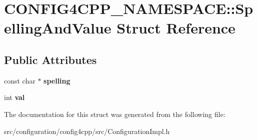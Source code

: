 \hypertarget{structCONFIG4CPP__NAMESPACE_1_1SpellingAndValue}{\section{C\-O\-N\-F\-I\-G4\-C\-P\-P\-\_\-\-N\-A\-M\-E\-S\-P\-A\-C\-E\-:\-:Spelling\-And\-Value Struct Reference}
\label{structCONFIG4CPP__NAMESPACE_1_1SpellingAndValue}
}
\subsection*{Public Attributes}
\begin{DoxyCompactItemize}
\item 
\hypertarget{structCONFIG4CPP__NAMESPACE_1_1SpellingAndValue_aefe6e6ddcb5c5241900fe329f8cd615f}{const char $\ast$ {\bfseries spelling}}\label{structCONFIG4CPP__NAMESPACE_1_1SpellingAndValue_aefe6e6ddcb5c5241900fe329f8cd615f}

\item 
\hypertarget{structCONFIG4CPP__NAMESPACE_1_1SpellingAndValue_a2be73af85e1668b820ae7d8747b2d612}{int {\bfseries val}}\label{structCONFIG4CPP__NAMESPACE_1_1SpellingAndValue_a2be73af85e1668b820ae7d8747b2d612}

\end{DoxyCompactItemize}


The documentation for this struct was generated from the following file\-:\begin{DoxyCompactItemize}
\item 
src/configuration/config4cpp/src/Configuration\-Impl.\-h\end{DoxyCompactItemize}
